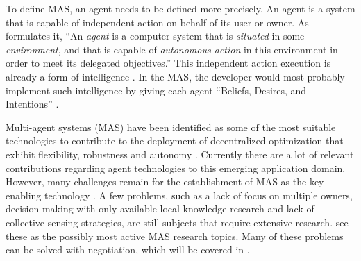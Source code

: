 To define MAS, an agent needs to be defined more precisely. An agent is a system that is capable of independent action on behalf of its user or owner. As  \citet{wooldridge2009introduction} formulates it, ``An \textit{agent} is a computer system that is \textit{situated} in some \textit{environment}, and that is capable of \textit{autonomous action} in this environment in order to meet its delegated objectives.'' This independent action execution is already a form of intelligence \citep{wooldridge2009introduction}. In the MAS, the developer would most probably implement such intelligence by giving each agent ``Beliefs, Desires, and Intentions'' \citep{rao1995bdi}.  

Multi-agent systems (MAS) have been identified as some of the most suitable technologies to contribute to the deployment of decentralized optimization that exhibit flexibility, robustness and autonomy \citep{vinyals2010survey}. Currently there are a lot of relevant contributions regarding agent technologies to this emerging application domain. However, many challenges remain for the establishment of MAS as the key enabling technology \citep{vinyals2010survey}. A few problems, such as a lack of focus on multiple owners, decision making with only available local knowledge research and lack of collective sensing strategies, are still subjects that require extensive research. \citet{vinyals2010survey} see these as the possibly most active MAS research topics. Many of these problems can be solved with negotiation, which will be covered in .

